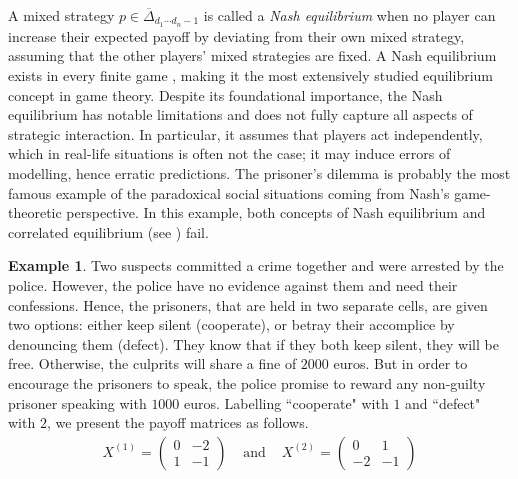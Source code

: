 \documentclass[11pt]{amsart}
\numberwithin{equation}{section}
\theoremstyle{plain}
\numberwithin{theorem}{section}
\theoremstyle{definition}
\newtheorem{example}[theorem]{Example}
\begin{document}
\noindent A mixed strategy $p \in \overline{\Delta}_{d_1 \cdots d_n -1}$ is called a \textit{Nash equilibrium} when no player can increase their expected payoff by deviating from their own mixed strategy, assuming that the other players' mixed strategies are fixed. A Nash equilibrium exists in every finite game \cite{nash1950equilibrium}, making it the most extensively studied equilibrium concept in game theory. Despite its foundational importance, the Nash equilibrium has notable limitations and does not fully capture all aspects of strategic interaction. In particular, it assumes that players act independently, which in real-life situations is often not the case; it may induce errors of modelling, hence erratic predictions.
The prisoner's dilemma is probably the most famous example of the paradoxical social situations coming from Nash's game-theoretic perspective. In this example, both concepts of Nash equilibrium and correlated equilibrium (see \cite[Section 3]{spohn2007dependency}) fail.



\begin{example}\label{Example $1.16$}
    Two suspects committed a crime together and were arrested by the police. However, the police have no evidence against them and need their confessions. Hence, the prisoners, that are held in two separate cells, are given two options: either keep silent (cooperate), or betray their accomplice by denouncing them (defect). They know that if they both keep silent, they will be free. Otherwise, the culprits will share a fine of $2000$ euros. But in order to encourage the prisoners to speak, the police promise to reward any non-guilty prisoner speaking with $1000$ euros. Labelling ``cooperate"  with $1$ and ``defect" with $2$, we present the payoff matrices as follows. 
\[
\begin{array}{ccc}
X^{(1)}=\begin{pmatrix}
    0&-2\\1&-1
\end{pmatrix} & \text{ and } &X^{(2)}=\begin{pmatrix}
    0&1\\-2&-1
\end{pmatrix}
\end{array}
\]
\end{example}
\end{document}
